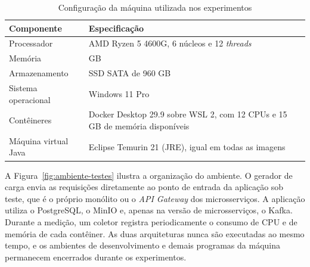 \begin{table}[htbp]
\centering
\caption{Configuração da máquina utilizada nos experimentos}
\label{tab:maquina}
\small
\begin{tabular}{|>{\raggedright\arraybackslash}p{4.4cm}|>{\raggedright\arraybackslash}p{10.2cm}|}
\hline
\textbf{Componente} & \textbf{Especificação} \\ \hline
Processador & AMD Ryzen 5 4600G, 6 núcleos e 12 \textit{threads} \\ \hline
Memória & 32 GB \\ \hline
Armazenamento & SSD SATA de 960 GB \\ \hline
Sistema operacional & Windows 11 Pro \\ \hline
Contêineres & Docker Desktop 29.9 sobre WSL 2, com 12 CPUs e 15 GB de memória disponíveis \\ \hline
Máquina virtual Java & Eclipse Temurin 21 (JRE), igual em todas as imagens \\ \hline
\end{tabular}
\par\vspace{4pt}{\footnotesize Fonte: Elaborada pelo autor (2026).}
\end{table}

A Figura~\ref{fig:ambiente-testes} ilustra a organização do ambiente. O gerador de carga envia
as requisições diretamente ao ponto de entrada da aplicação sob teste, que é o próprio monólito
ou o \textit{API Gateway} dos microsserviços. A aplicação utiliza o PostgreSQL, o MinIO e,
apenas na versão de microsserviços, o Kafka. Durante a medição, um coletor registra
periodicamente o consumo de CPU e de memória de cada contêiner. As duas arquiteturas nunca são
executadas ao mesmo tempo, e os ambientes de desenvolvimento e demais programas da máquina
permanecem encerrados durante os experimentos.


